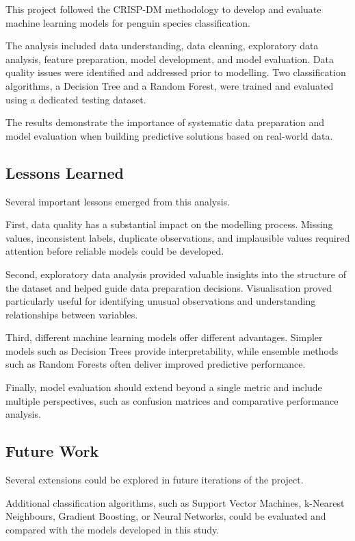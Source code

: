 \documentclass[
]{article}
\begin{document}
This project followed the CRISP-DM methodology to develop and evaluate
machine learning models for penguin species classification.

The analysis included data understanding, data cleaning, exploratory
data analysis, feature preparation, model development, and model
evaluation. Data quality issues were identified and addressed prior to
modelling. Two classification algorithms, a Decision Tree and a Random
Forest, were trained and evaluated using a dedicated testing dataset.

The results demonstrate the importance of systematic data preparation
and model evaluation when building predictive solutions based on
real-world data.

\subsection{Lessons Learned}\label{lessons-learned}

Several important lessons emerged from this analysis.

First, data quality has a substantial impact on the modelling process.
Missing values, inconsistent labels, duplicate observations, and
implausible values required attention before reliable models could be
developed.

Second, exploratory data analysis provided valuable insights into the
structure of the dataset and helped guide data preparation decisions.
Visualisation proved particularly useful for identifying unusual
observations and understanding relationships between variables.

Third, different machine learning models offer different advantages.
Simpler models such as Decision Trees provide interpretability, while
ensemble methods such as Random Forests often deliver improved
predictive performance.

Finally, model evaluation should extend beyond a single metric and
include multiple perspectives, such as confusion matrices and
comparative performance analysis.

\subsection{Future Work}\label{future-work}

Several extensions could be explored in future iterations of the
project.

Additional classification algorithms, such as Support Vector Machines,
k-Nearest Neighbours, Gradient Boosting, or Neural Networks, could be
evaluated and compared with the models developed in this study.
\end{document}
